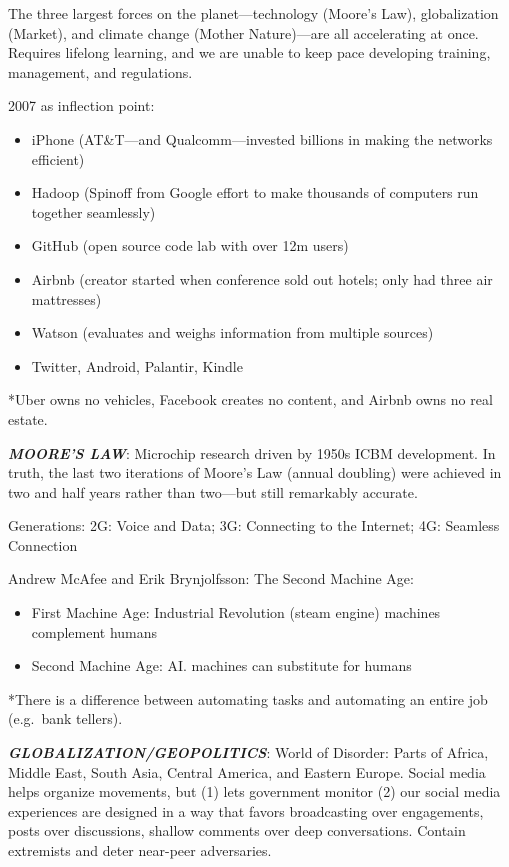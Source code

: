 \documentclass[
]{article}
\begin{document}
The three largest forces on the planet---technology (Moore's Law),
globalization (Market), and climate change (Mother Nature)---are all
accelerating at once. Requires lifelong learning, and we are unable to
keep pace developing training, management, and regulations.

2007 as inflection point:

\begin{itemize}
\item
  iPhone (AT\&T---and Qualcomm---invested billions in making the
  networks efficient)
\item
  Hadoop (Spinoff from Google effort to make thousands of computers run
  together seamlessly)
\item
  GitHub (open source code lab with over 12m users)
\item
  Airbnb (creator started when conference sold out hotels; only had
  three air mattresses)
\item
  Watson (evaluates and weighs information from multiple sources)
\item
  Twitter, Android, Palantir, Kindle
\end{itemize}

*Uber owns no vehicles, Facebook creates no content, and Airbnb owns no
real estate.

\textbf{\emph{MOORE'S LAW}}: Microchip research driven by 1950s ICBM
development. In truth, the last two iterations of Moore's Law (annual
doubling) were achieved in two and half years rather than two---but
still remarkably accurate.

Generations: 2G: Voice and Data; 3G: Connecting to the Internet; 4G:
Seamless Connection

Andrew McAfee and Erik Brynjolfsson: The Second Machine Age:

\begin{itemize}
\item
  First Machine Age: Industrial Revolution (steam engine) machines
  complement humans
\item
  Second Machine Age: AI. machines can substitute for humans
\end{itemize}

*There is a difference between automating tasks and automating an entire
job (e.g.~bank tellers).

\textbf{\emph{GLOBALIZATION/GEOPOLITICS}}: World of Disorder: Parts of
Africa, Middle East, South Asia, Central America, and Eastern Europe.
Social media helps organize movements, but (1) lets government monitor
(2) our social media experiences are designed in a way that favors
broadcasting over engagements, posts over discussions, shallow comments
over deep conversations. Contain extremists and deter near-peer
adversaries.
\end{document}
